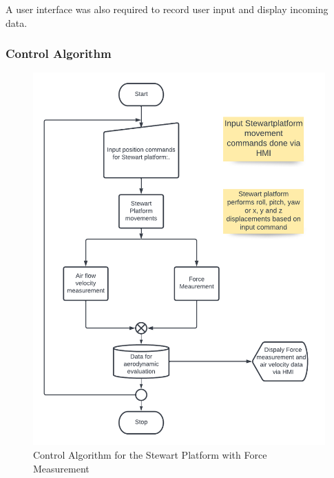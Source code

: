 A user interface was also required to record user input and display incoming data.
\subsubsection{Control Algorithm}
\begin{center}
	\begin{figure}[H]
		\centering
		\includegraphics[width=0.7\linewidth]{Figures/Flow}
		\caption[Control Algorithm]{Control Algorithm for the Stewart Platform with Force Measurement}
	\end{figure}
\end{center}